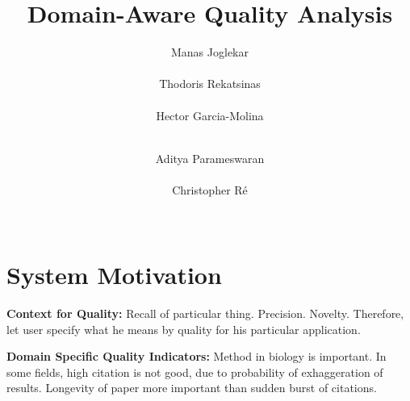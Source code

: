 \documentclass{sig-alternate}
\newcounter{prob}
\newcommand{\stitle}[1]{\vspace{0.5em}\noindent\textbf{#1}}
\begin{document}
\title{Domain-Aware Quality Analysis}
\author{
\alignauthor
Manas Joglekar\\
       \\
\alignauthor
Thodoris Rekatsinas\\
       \\
\alignauthor
Hector Garcia-Molina\\
       \\
\and
\alignauthor 
Aditya Parameswaran\\
       \\
\alignauthor
Christopher R\'e\\
       \\
}
\maketitle

\section{System Motivation}

\stitle{Context for Quality:} Recall of particular thing. Precision. Novelty. Therefore, let user specify what he means by quality for his particular application. 

\stitle{Domain Specific Quality Indicators:} Method in biology is important. In some fields, high citation is not good, due to probability of exhaggeration of results. Longevity of paper more important than sudden burst of citations. 
\end{document}
